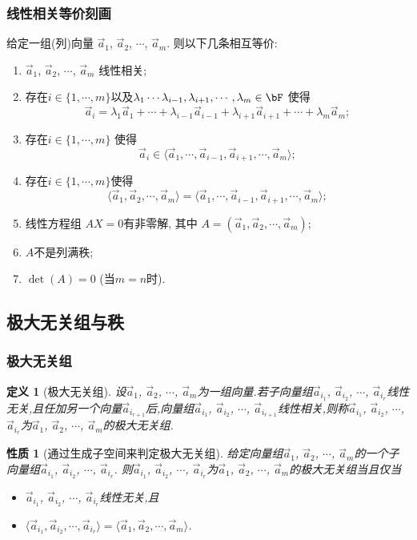 \documentclass{article}
\newtheorem{proposition}[theorem]{性质}  %
\newtheorem{definition}[theorem]{定义}
\renewcommand{\blue }[1]{{\textcolor[rgb]{0,0,1}{#1}}}
\begin{document}
\subsubsection{线性相关等价刻画}
给定一组(列)向量 $\vec{a}_1$, $\vec{a}_2$, $\cdots$, $\vec{a}_m$. 则以下几条相互等价:
\begin{enumerate}
\item $\vec{a}_1$, $\vec{a}_2$, $\cdots$, $\vec{a}_m$ 线性相关;
\item 存在$i\in\{1,\cdots,m\}$以及$\lambda_1\cdots\lambda_{i-1},\lambda_{i+1},\cdots,\lambda_m\in \bF$ 使得
\[\vec{a}_i=\lambda_1\vec{a}_1 + \cdots+ \lambda_{i-1}\vec{a}_{i-1}  +\lambda_{i+1}\vec{a}_{i+1} + \cdots + \lambda_m\vec{a}_m;\]
\item 存在$i\in\{1,\cdots,m\}$ 使得
\[\vec{a}_i \in \langle \vec{a}_1,\cdots,\vec{a}_{i-1},\vec{a}_{i+1},\cdots,\vec{a}_m\rangle;\]
\item 存在$i\in\{1,\cdots,m\}$使得
\[\langle \vec{a}_1,\vec{a}_{2},\cdots,\vec{a}_m\rangle = \langle \vec{a}_1,\cdots,\vec{a}_{i-1},\vec{a}_{i+1},\cdots,\vec{a}_m\rangle;\]
\item 线性方程组 $AX=0$有非零解, 其中 $A=(\vec{a}_1,\vec{a}_{2},\cdots,\vec{a}_m)$;
\item $A$不是列满秩;
\item $\det(A)=0$ (当$m=n$时).
\end{enumerate}


\subsection{极大无关组与秩}

\subsubsection{极大无关组}
\begin{definition}[极大无关组]
设$\vec{a}_1$, $\vec{a}_2$, $\cdots$, $\vec{a}_m$为一组向量.若子向量组$\vec{a}_{i_1}$, $\vec{a}_{i_2}$, $\cdots$, $\vec{a}_{i_r}$线性无关,且任加另一个向量$\vec{a}_{i_{r+1}}$后,向量组$\vec{a}_{i_1}$, $\vec{a}_{i_2}$, $\cdots$, $\vec{a}_{i_{r+1}}$线性相关,则称$\vec{a}_{i_1}$, $\vec{a}_{i_2}$, $\cdots$, $\vec{a}_{i_r}$为$\vec{a}_1$, $\vec{a}_2$, $\cdots$, $\vec{a}_m$的\blue{极大无关组}.
\end{definition}
\begin{proposition}[通过生成子空间来判定极大无关组]
给定向量组$\vec{a}_1$, $\vec{a}_2$, $\cdots$, $\vec{a}_m$的一个子向量组$\vec{a}_{i_1}$, $\vec{a}_{i_2}$, $\cdots$, $\vec{a}_{i_r}$. 则$\vec{a}_{i_1}$, $\vec{a}_{i_2}$, $\cdots$, $\vec{a}_{i_r}$为$\vec{a}_1$, $\vec{a}_2$, $\cdots$, $\vec{a}_m$的极大无关组当且仅当
\begin{itemize}
\item $\vec{a}_{i_1}$, $\vec{a}_{i_2}$, $\cdots$, $\vec{a}_{i_r}$线性无关,且
\item $\langle \vec{a}_{i_1},\vec{a}_{i_2},\cdots,\vec{a}_{i_r}\rangle=\langle\vec{a}_1,\vec{a}_2,\cdots,\vec{a}_m\rangle$.
\end{itemize}
\end{proposition}
\end{document}
